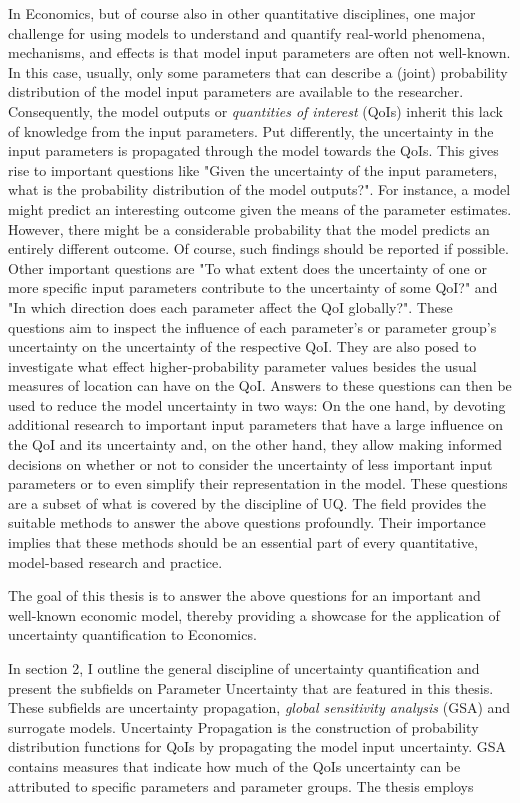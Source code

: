 In Economics, but of course also in other quantitative disciplines, one major challenge for using models to understand and quantify real-world phenomena, mechanisms, and effects is that model input parameters are often not well-known. In this case, usually, only some parameters that can describe a (joint) probability distribution of the model input parameters are available to the researcher. Consequently, the model outputs or \textit{quantities of interest} (QoIs) inherit this lack of knowledge from the input parameters. Put differently, the uncertainty in the input parameters is propagated through the model towards the QoIs. This gives rise to important questions like "Given the uncertainty of the input parameters, what is the probability distribution of the model outputs?". For instance, a model might predict an interesting outcome given the means of the parameter estimates. However, there might be a considerable probability that the model predicts an entirely different outcome. Of course, such findings should be reported if possible. Other important questions are "To what extent does the uncertainty of one or more specific input parameters contribute to the uncertainty of some QoI?" and "In which direction does each parameter affect the QoI globally?". These questions aim to inspect the influence of each parameter's or parameter group's uncertainty on the uncertainty of the respective QoI. They are also posed to investigate what effect higher-probability parameter values besides the usual measures of location can have on the QoI. Answers to these questions can then be used to reduce the model uncertainty in two ways: On the one hand, by devoting additional research to important input parameters that have a large influence on the QoI and its uncertainty and, on the other hand, they allow making informed decisions on whether or not to consider the uncertainty of less important input parameters or to even simplify their representation in the model. 
These questions are a subset of what is covered by the discipline of UQ. The field provides the suitable methods to answer the above questions profoundly. Their importance implies that these methods should be an essential part of every quantitative, model-based research and practice.

The goal of this thesis is to answer the above questions for an important and well-known economic model, thereby providing a showcase for the application of uncertainty quantification to Economics.

In section 2, I outline the general discipline of uncertainty quantification and present the subfields on Parameter Uncertainty that are featured in this thesis. These subfields are uncertainty propagation, \textit{global sensitivity analysis} (GSA) and surrogate models. Uncertainty Propagation is the construction of probability distribution functions for QoIs by propagating the model input uncertainty. GSA contains measures that indicate how much of the QoIs uncertainty can be attributed to specific parameters and parameter groups. The thesis employs 

